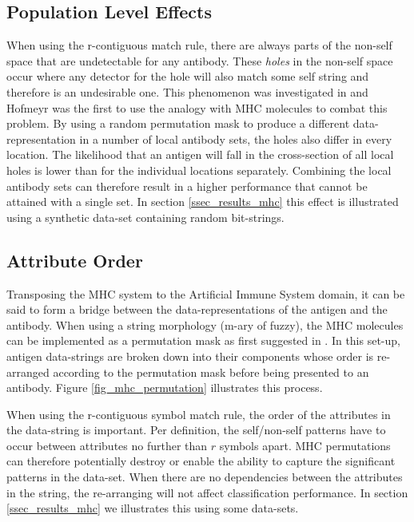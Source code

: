 \documentclass{llncs}
\begin{document}
\subsection{Population Level Effects}
\label{ssec_mhc_population}
When using the r-contiguous match rule, there are always parts of the non-self space that are undetectable for any antibody.
These {\it holes} in the non-self space occur where any detector for the hole will also match some self string and therefore is an undesirable one.
This phenomenon was investigated in \cite{dhaeseleer} and Hofmeyr \cite{hofmeyr} was the first to use the analogy with MHC molecules to combat this problem.
By using a random permutation mask to produce a different data-representation in a number of local antibody sets, the holes also differ in every location.
The likelihood that an antigen will fall in the cross-section of all local holes is lower than for the individual locations separately.
Combining the local antibody sets can therefore result in a higher performance that cannot be attained with a single set.
In section \ref{ssec_results_mhc} this effect is illustrated using a synthetic data-set containing random bit-strings.

\subsection{Attribute Order}
\label{ssec_mhc_order}
Transposing the MHC system to the Artificial Immune System domain, it can be said to form a bridge between the data-representations of the antigen and the antibody.
When using a string morphology (m-ary of fuzzy), the MHC molecules can be implemented as a permutation mask as first suggested in \cite{hofmeyr}.
In this set-up, antigen data-strings are broken down into their components whose order is re-arranged according to the permutation mask before being presented to an antibody.
Figure \ref{fig_mhc_permutation} illustrates this process.

When using the r-contiguous symbol match rule, the order of the attributes in the data-string is important.
Per definition, the self/non-self patterns have to occur between attributes no further than $r$ symbols apart.
MHC permutations can therefore potentially destroy or enable the ability to capture the significant patterns in the data-set.
When there are no dependencies between the attributes in the string, the re-arranging will not affect classification performance.
In section \ref{ssec_results_mhc} we illustrates this using some data-sets.
\end{document}
